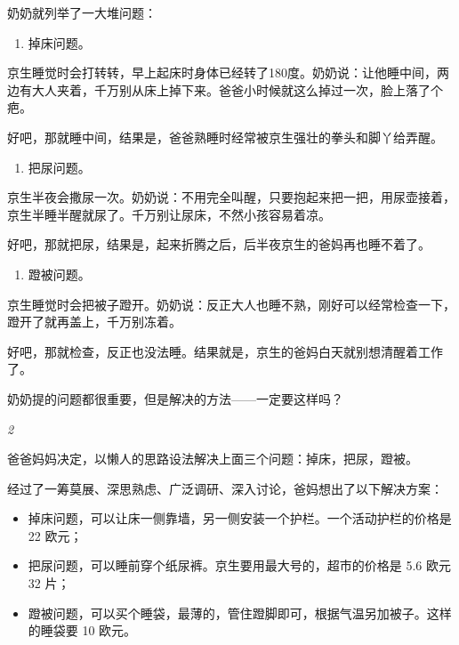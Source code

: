 \documentclass[twoside,openright,headings=optiontohead]{ctexbook} %
\providecommand{\tightlist}{%
   \setlength{\itemsep}{0pt}\setlength{\parskip}{0pt}}
\begin{document}
{奶奶就列举了一大堆问题：

\begin{enumerate}
\def\labelenumi{\arabic{enumi}.}
\tightlist
\item
  掉床问题。
\end{enumerate}

京生睡觉时会打转转，早上起床时身体已经转了180度。奶奶说：让他睡中间，两边有大人夹着，千万别从床上掉下来。爸爸小时候就这么掉过一次，脸上落了个疤。

好吧，那就睡中间，结果是，爸爸熟睡时经常被京生强壮的拳头和脚丫给弄醒。

\begin{enumerate}
\def\labelenumi{\arabic{enumi}.}
\setcounter{enumi}{1}
\tightlist
\item
  把尿问题。
\end{enumerate}

京生半夜会撒尿一次。奶奶说：不用完全叫醒，只要抱起来把一把，用尿壶接着，京生半睡半醒就尿了。千万别让尿床，不然小孩容易着凉。

好吧，那就把尿，结果是，起来折腾之后，后半夜京生的爸妈再也睡不着了。

\begin{enumerate}
\def\labelenumi{\arabic{enumi}.}
\setcounter{enumi}{2}
\tightlist
\item
  蹬被问题。
\end{enumerate}

京生睡觉时会把被子蹬开。奶奶说：反正大人也睡不熟，刚好可以经常检查一下，蹬开了就再盖上，千万别冻着。

好吧，那就检查，反正也没法睡。结果就是，京生的爸妈白天就别想清醒着工作了。

奶奶提的问题都很重要，但是解决的方法------一定要这样吗？

\emph{2}

爸爸妈妈决定，以懒人的思路设法解决上面三个问题：掉床，把尿，蹬被。

经过了一筹莫展、深思熟虑、广泛调研、深入讨论，爸妈想出了以下解决方案：

\begin{itemize}
\item
  掉床问题，可以让床一侧靠墙，另一侧安装一个护栏。一个活动护栏的价格是
  22 欧元；
\item
  把尿问题，可以睡前穿个纸尿裤。京生要用最大号的，超市的价格是 5.6 欧元
  32 片；
\item
  蹬被问题，可以买个睡袋，最薄的，管住蹬脚即可，根据气温另加被子。这样的睡袋要
  10 欧元。
\end{itemize}

}
\end{document}
